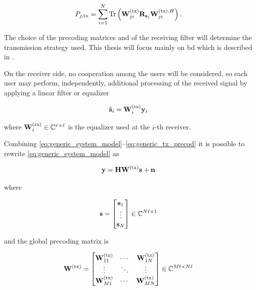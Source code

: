 \begin{equation} \label{eq:bs_precod_power}
    P_{j, \text{tx}} = \sum\limits_{i=1}^{N} \operatorname*{Tr} \left( \mathbf{W}^{(\text{tx})}_{ji} \mathbf{R}_{\mathbf{s}_i}
    \mathbf{W}^{(\text{tx}),H}_{ji} \right).
\end{equation}

The choice of the precoding matrices and of the receiving filter will determine
the transmission strategy used. This thesis will focus mainly on \gls{bd}
\cite{spencer04} which is described in .

On the receiver side, no cooperation among the users will be considered, so each
user may perform, independently, additional processing of the received signal by
applying a linear filter or equalizer

\begin{equation} \label{eq:generic_rx_eq}
    \hat{\mathbf{s}}_i = \mathbf{W}^{(\text{rx})}_i \mathbf{y}_i
\end{equation}

\noindent
where $\mathbf{W}^{(\text{rx})}_i \in \mathbb{C}^{r \times \ell}$ is the equalizer used at the $i$-th
receiver.

Combining \eqref{eq:generic_system_model}--\eqref{eq:generic_tx_precod} it is
possible to rewrite \eqref{eq:generic_system_model} as

\begin{equation} \label{eq:system_model}
    \mathbf{y} = \mathbf{H} \mathbf{W}^{(\text{tx})} \mathbf{s} + \mathbf{n}
\end{equation}

\noindent
where

\begin{equation} \label{data_symbols}
    \mathbf{s} = \begin{bmatrix}
        \mathbf{s}_1 \\
        \vdots \\
        \mathbf{s}_N
    \end{bmatrix} \in \mathbb{C}^{N\ell \times 1}
\end{equation}

\noindent
and the global precoding matrix is

\begin{equation} \label{eq:precoding_matrix}
    \mathbf{W}^{(\text{tx})} = \begin{bmatrix}
        \mathbf{W}^{(\text{tx})}_{11} & \cdots & \mathbf{W}^{(\text{tx})}_{1N} \\
        \vdots    & \ddots & \vdots \\
        \mathbf{W}^{(\text{tx})}_{M1} & \cdots & \mathbf{W}^{(\text{tx})}_{MN} \\
    \end{bmatrix} \in \mathbb{C}^{Mt \times N\ell}
\end{equation}

